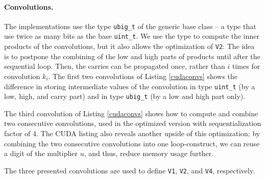 \paragraph{Convolutions.}
The implementations use the type \texttt{ubig\_t} of the generic base class -- a
type that use twice as many bits as the base \texttt{uint\_t}. We use the type
to compute the inner products of the convolutions, but it also allows the
optimization of \texttt{V2}: The idea is to postpone the combining of the low
and high parts of products until after the sequential loop. Then, the carries
can be propagated once, rather than $i$ times for convolution $k_i$. The first
two convolutions of Listing \ref{cudaconvs} shows the difference in storing
intermediate values of the convolution in type \texttt{uint\_t} (by a low, high,
and carry part) and in type \texttt{ubig\_t} (by a low and high part only).

The third convolution of Listing \ref{cudaconvs} shows how to compute and
combine two consecutive convolutions, used in the optimized version with
sequentialization factor of 4. The CUDA listing also reveals another upside of
this optimization; by combining the two consecutive convolutions into one
loop-construct, we can reuse a digit of the multiplier $u$, and thus, reduce
memory usage further.

The three presented convolutions are used to define \texttt{V1}, \texttt{V2},
and \texttt{V4}, respectively.

